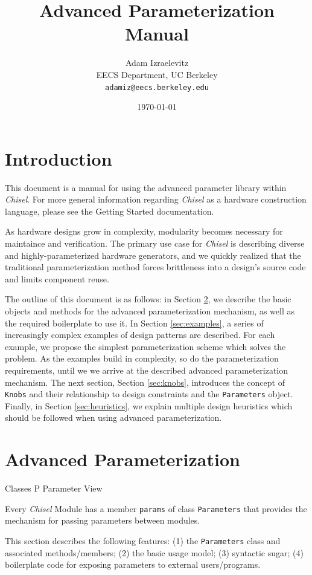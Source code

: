 \documentclass[10pt,twocolumn]{article}
\title{Advanced Parameterization Manual}
\author{Adam Izraelevitz \\
EECS Department, UC Berkeley\\
{\tt  adamiz@eecs.berkeley.edu}
}
\date{\today}
\def\code#1{{\small\tt #1}}
\begin{document}
\maketitle{}


\section{Introduction}

This document is a manual for using the advanced parameter library within {\em Chisel}. For more general information regarding {\em Chisel} as a hardware construction language, please see the Getting Started documentation.

As hardware designs grow in complexity, modularity becomes necessary for maintaince and verification. The primary use case for {\em Chisel} is describing diverse and highly-parameterized hardware generators, and we quickly realized that the traditional parameterization method forces brittleness into a design's source code and limits component reuse.

The outline of this document is as follows: in Section \ref{sec:advanced}, we describe the basic objects and methods for the advanced parameterization mechanism, as well as the required boilerplate to use it. In Section \ref{sec:examples}, a series of increasingly complex examples of design patterns are described. For each example, we propose the simplest parameterization scheme which solves the problem. As the examples build in complexity, so do the parameterization requirements, until we we arrive at the described advanced parameterization mechanism. The next section, Section \ref{sec:knobs}, introduces the concept of \code{Knobs} and their relationship to design constraints and the \code{Parameters} object. Finally, in Section \ref{sec:heuristics}, we explain multiple design heuristics which should be followed when using advanced parameterization.

\section{Advanced Parameterization}
\label{sec:advanced}

Classes
	P
	Parameter
	View
	
Every {\em Chisel} Module has a member \code{params} of class \code{Parameters} that provides the mechanism for passing parameters between modules.

This section describes the following features: (1) the \code{Parameters} class and associated methods/members; (2) the basic usage model; (3) syntactic sugar; (4) boilerplate code for exposing parameters to external users/programs.
\end{document}
